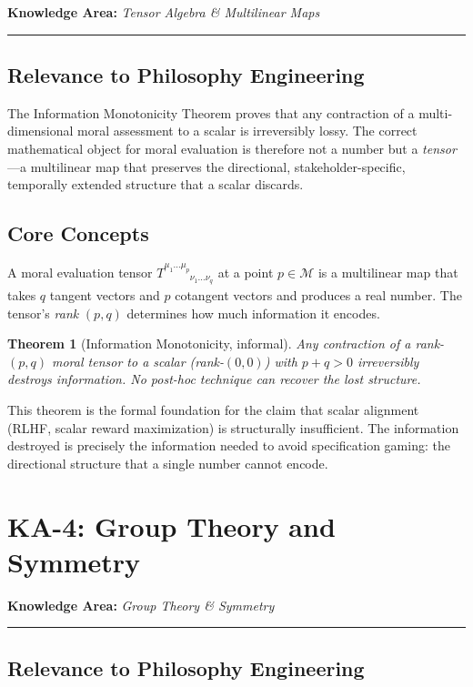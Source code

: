 \documentclass[12pt,letterpaper]{article}
\newtheorem{theorem}{Theorem}[section]
\theoremstyle{definition}
\theoremstyle{plain}
\newcommand{\calM}{\mathcal{M}}
\newcommand{\ka}[1]{\vspace{1em}\noindent\textbf{\large Knowledge Area:} \textit{#1}\vspace{0.5em}\hrule\vspace{0.5em}}
\begin{document}
\ka{Tensor Algebra \& Multilinear Maps}

\subsection{Relevance to Philosophy Engineering}

The Information Monotonicity Theorem proves that any contraction of a multi-dimensional moral assessment to a scalar is irreversibly lossy. The correct mathematical object for moral evaluation is therefore not a number but a \emph{tensor}---a multilinear map that preserves the directional, stakeholder-specific, temporally extended structure that a scalar discards.

\subsection{Core Concepts}

A moral evaluation tensor $T^{\mu_1 \ldots \mu_p}_{\phantom{\mu_1 \ldots \mu_p}\nu_1 \ldots \nu_q}$ at a point $p \in \calM$ is a multilinear map that takes $q$ tangent vectors and $p$ cotangent vectors and produces a real number. The tensor's \emph{rank} $(p,q)$ determines how much information it encodes.

\begin{theorem}[Information Monotonicity, informal]
\label{thm:info-mono-informal}
Any contraction of a rank-$(p,q)$ moral tensor to a scalar (rank-$(0,0)$) with $p + q > 0$ irreversibly destroys information. No post-hoc technique can recover the lost structure.
\end{theorem}

This theorem is the formal foundation for the claim that scalar alignment (RLHF, scalar reward maximization) is structurally insufficient. The information destroyed is precisely the information needed to avoid specification gaming: the directional structure that a single number cannot encode.


\section{KA-4: Group Theory and Symmetry}
\label{sec:ka4}

\ka{Group Theory \& Symmetry}

\subsection{Relevance to Philosophy Engineering}
\end{document}
